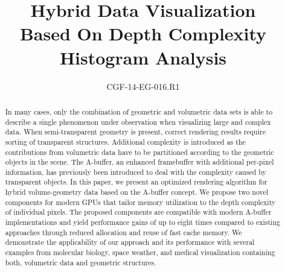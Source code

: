 \documentclass{egpubl}
\title[Hybrid Data Visualization]%
      {Hybrid Data Visualization\\ Based On Depth Complexity Histogram Analysis}
\author[CGF-14-EG-016.R1]
       {CGF-14-EG-016.R1}
\newcommand{\yellow}[1]{{\color{Goldenrod}#1}}
\newcommand{\green}[1]{{\color{PineGreen}#1}}
\newcommand{\minor}[1]{\yellow{#1}}
\newcommand{\new}[1]{\green{#1}}
\newcommand{\ab}{\mbox{A-buffer}}
\newlength{\imgWidth}
\newif\ifSplitBoxFramed
\newcommand{\splitImage}[2]{%
  \begin{tikzpicture}[x=\imgWidth,y=-\imgWidth] %
    \clip (0,0) rectangle (1,1);
    \begin{scope}[]
      \clip (0,0) -- (\topLineRatio,0) -- (\bottomLineRatio,1) -- (0,1);
      \draw(0,0) node[anchor=north west,inner sep=0pt]{%
        \texttt{[image: \#1]}};
    \end{scope}
    \begin{scope}[]
      \clip  (\topLineRatio,0) -- (\bottomLineRatio,1) -- (1,1) -- (1,0);
      \draw(0,0) node[anchor=north west,inner sep=0pt]{%
        \texttt{[image: \#2]}};
    \end{scope}
    \draw[black,very thick] (\topLineRatio,0) -- (\bottomLineRatio,1) ;
    \ifSplitBoxFramed%
      \draw[line width=1pt] (0,0) rectangle (1,1);
    \fi
  \end{tikzpicture}
}
\newcommand{\goldenRatioLong}{0.618}
\newcommand{\goldenRatioShort}{0.382}
\newcommand{\setSplitLineRatios}[2]{%
  \def\topLineRatio{#1}
  \def\bottomLineRatio{#2}
}
\begin{document}
\setSplitLineRatios{\goldenRatioLong}{\goldenRatioShort}


\maketitle

\begin{abstract}
%
In many cases, only the combination of geometric and volumetric data sets is able to describe a single phenomenon under observation when visualizing large and complex data.
When semi-transparent geometry is present, correct rendering results require sorting of transparent structures. 
Additional complexity is introduced as the contributions from volumetric data have to be partitioned according to the geometric objects in the scene.
The \ab{}, an enhanced framebuffer with additional per-pixel information, has previously been introduced to deal with the complexity caused by transparent objects. 
In this paper, we present an optimized rendering algorithm for hybrid volume-geometry data based on the \ab{} concept. 
We propose two novel components for modern GPUs that \minor{tailor} memory utilization to the depth complexity of individual pixels.
The proposed components are compatible with modern \ab{} implementations and yield performance gains of up to eight times compared to existing approaches \new{through reduced allocation and reuse of fast cache memory}. 
%
We demonstrate the applicability of our approach and its performance with several examples from molecular biology, space weather, and medical visualization containing both, volumetric data and geometric structures.

\begin{classification} %
\end{classification}

\end{abstract}
\end{document}
